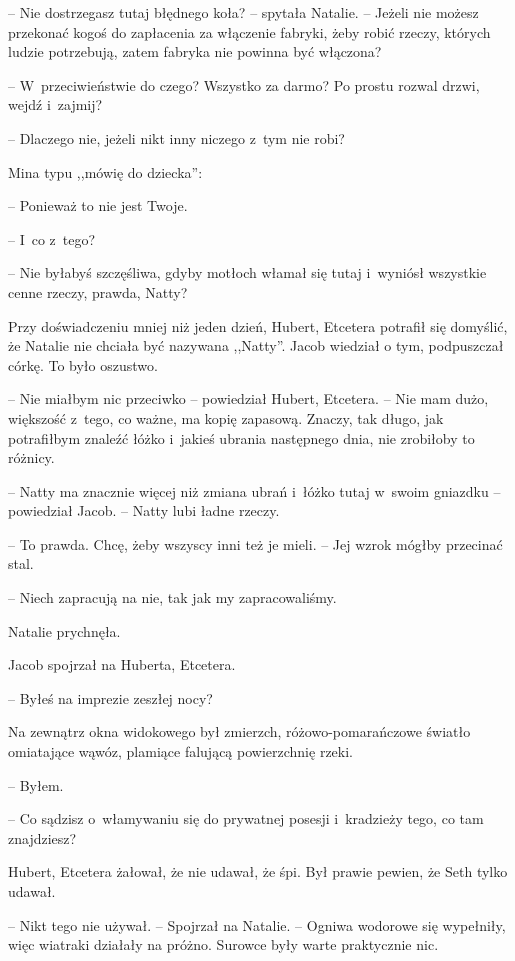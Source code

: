 \documentclass[oneside,polish,11pt,sfheadings]{mwbk}
\begin{document}
-- Nie dostrzegasz tutaj błędnego koła? -- spytała Natalie. -- Jeżeli nie
możesz przekonać kogoś do zapłacenia za włączenie fabryki, żeby robić
rzeczy, których ludzie potrzebują, zatem fabryka nie powinna być
włączona?

-- W~przeciwieństwie do czego? Wszystko za darmo? Po prostu rozwal drzwi,
wejdź i~zajmij?

-- Dlaczego nie, jeżeli nikt inny niczego z~tym nie robi?

Mina typu ,,mówię do dziecka'': 

-- Ponieważ to nie jest Twoje.

-- I~co z~tego?

-- Nie byłabyś szczęśliwa, gdyby motłoch włamał się tutaj i~wyniósł
wszystkie cenne rzeczy, prawda, Natty?

Przy doświadczeniu mniej niż jeden dzień, Hubert, Etcetera potrafił się
domyślić, że Natalie nie chciała być nazywana ,,Natty''. Jacob wiedział
o tym, podpuszczał córkę. To było oszustwo.

-- Nie miałbym nic przeciwko -- powiedział Hubert, Etcetera. -- Nie mam
dużo, większość z~tego, co ważne, ma kopię zapasową. Znaczy, tak długo,
jak potrafiłbym znaleźć łóżko i~jakieś ubrania następnego dnia, nie
zrobiłoby to różnicy.

-- Natty ma znacznie więcej niż zmiana ubrań i~łóżko tutaj w~swoim
gniazdku -- powiedział Jacob. -- Natty lubi ładne rzeczy.

-- To prawda. Chcę, żeby wszyscy inni też je mieli. -- Jej wzrok mógłby
przecinać stal.

-- Niech zapracują na nie, tak jak my zapracowaliśmy.

Natalie prychnęła.

Jacob spojrzał na Huberta, Etcetera. 

-- Byłeś na imprezie zeszłej nocy?

Na zewnątrz okna widokowego był zmierzch, różowo-pomarańczowe światło
omiatające wąwóz, plamiące falującą powierzchnię rzeki.

-- Byłem.

-- Co sądzisz o~włamywaniu się do prywatnej posesji i~kradzieży tego, co
tam znajdziesz?

Hubert, Etcetera żałował, że nie udawał, że śpi. Był prawie pewien, że
Seth tylko udawał.

-- Nikt tego nie używał. -- Spojrzał na Natalie. -- Ogniwa wodorowe się
wypełniły, więc wiatraki działały na próżno. Surowce były warte
praktycznie nic.
\end{document}
